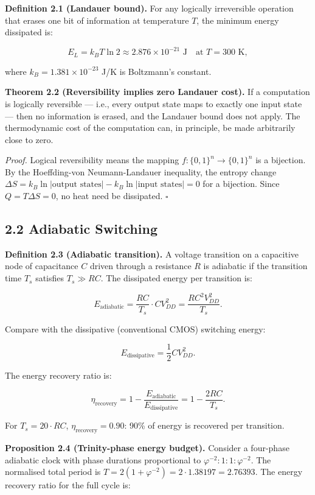\textbf{Definition 2.1 (Landauer bound).} For any logically
irreversible operation that erases one bit of information at
temperature \(T\), the minimum energy dissipated is:

\[
E_L = k_B T \ln 2 \approx 2.876 \times 10^{-21} \text{ J}
\quad\text{at } T = 300 \text{ K},
\]

where \(k_B = 1.381 \times 10^{-23}\) J/K is Boltzmann's constant.

\textbf{Theorem 2.2 (Reversibility implies zero Landauer cost).}
If a computation is logically reversible --- i.e., every output state
maps to exactly one input state --- then no information is erased, and
the Landauer bound does not apply. The thermodynamic cost of the
computation can, in principle, be made arbitrarily close to zero.

\emph{Proof.} Logical reversibility means the mapping
\(f: \{0,1\}^n \to \{0,1\}^n\) is a bijection. By the
Hoeffding-von Neumann-Landauer inequality, the entropy change
\(\Delta S = k_B \ln |\text{output states}| - k_B \ln
|\text{input states}| = 0\) for a bijection. Since
\(Q = T\Delta S = 0\), no heat need be dissipated. \(\square\)

\subsection{2.2 Adiabatic Switching}

\textbf{Definition 2.3 (Adiabatic transition).} A voltage transition
on a capacitive node of capacitance \(C\) driven through a resistance
\(R\) is adiabatic if the transition time \(T_s\) satisfies
\(T_s \gg RC\). The dissipated energy per transition is:

\[
E_{\text{adiabatic}} = \frac{RC}{T_s} \cdot C V_{DD}^2
= \frac{R C^2 V_{DD}^2}{T_s}.
\]

Compare with the dissipative (conventional CMOS) switching energy:

\[
E_{\text{dissipative}} = \frac{1}{2} C V_{DD}^2.
\]

The energy recovery ratio is:

\[
\eta_{\text{recovery}} = 1 - \frac{E_{\text{adiabatic}}}{E_{\text{dissipative}}}
= 1 - \frac{2RC}{T_s}.
\]

For \(T_s = 20 \cdot RC\), \(\eta_{\text{recovery}} = 0.90\): 90\%
of energy is recovered per transition.

\textbf{Proposition 2.4 (Trinity-phase energy budget).} Consider a
four-phase adiabatic clock with phase durations proportional to
\(\varphi^{-2} : 1 : 1 : \varphi^{-2}\). The normalised total period
is \(T = 2(1 + \varphi^{-2}) = 2 \cdot 1.38197 = 2.76393\). The
energy recovery ratio for the full cycle is:

